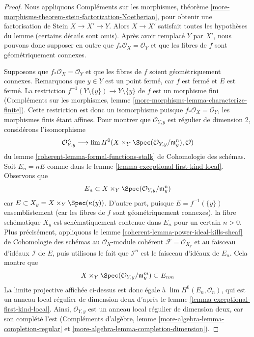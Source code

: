 \begin{proof} Nous appliquons Compléments sur les morphismes, théorème \ref{more-morphisms-theorem-stein-factorization-Noetherian}, pour obtenir une factorisation de Stein $X \to X' \to Y$. Alors $X \to X'$ satisfait toutes les hypothèses du lemme (certains détails sont omis). Après avoir remplacé $Y$ par $X'$, nous pouvons donc supposer en outre que $f_*\mathcal{O}_X = \mathcal{O}_Y$ et que les fibres de $f$ sont géométriquement connexes.

\medskip\noindent Supposons que $f_*\mathcal{O}_X = \mathcal{O}_Y$ et que les fibres de $f$ soient géométriquement connexes. Remarquons que $y \in Y$ est un point fermé, car $f$ est fermé et $E$ est fermé. La restriction $f^{-1}(Y \setminus \{y\}) \to Y \setminus \{y\}$ de $f$ est un morphisme fini (Compléments sur les morphismes, lemme \ref{more-morphisms-lemma-characterize-finite}). Cette restriction est donc un isomorphisme puisque $f_*\mathcal{O}_X = \mathcal{O}_Y$, les morphismes finis étant affines. Pour montrer que $\mathcal{O}_{Y, y}$ est régulier de dimension $2$, considérons l'isomorphisme $$
\mathcal{O}_{Y, y}^\wedge \longrightarrow
\lim H^0(X \times_Y \Spec(\mathcal{O}_{Y, y}/\mathfrak m_y^n), \mathcal{O})
$$ du lemme \ref{coherent-lemma-formal-functions-stalk} de Cohomologie des schémas. Soit $E_n = nE$ comme dans le lemme \ref{lemma-exceptional-first-kind-local}. Observons que $$
E_n \subset X \times_Y \Spec(\mathcal{O}_{Y, y}/\mathfrak m_y^n)
$$ car $E \subset X_y = X \times_Y \Spec(\kappa(y))$. D'autre part, puisque $E = f^{-1}(\{y\})$ ensemblistement (car les fibres de $f$ sont géométriquement connexes), la fibre schématique $X_y$ est schématiquement contenue dans $E_n$ pour un certain $n > 0$. Plus précisément, appliquons le lemme \ref{coherent-lemma-power-ideal-kills-sheaf} de Cohomologie des schémas au $\mathcal{O}_X$-module cohérent $\mathcal{F} = \mathcal{O}_{X_y}$ et au faisceau d'idéaux $\mathcal{I}$ de $E$, puis utilisons le fait que $\mathcal{I}^n$ est le faisceau d'idéaux de $E_n$. Cela montre que $$
X \times_Y \Spec(\mathcal{O}_{Y, y}/\mathfrak m_y^m) \subset E_{nm}
$$ La limite projective affichée ci-dessus est donc égale à $\lim H^0(E_n, \mathcal{O}_n)$, qui est un anneau local régulier de dimension deux d'après le lemme \ref{lemma-exceptional-first-kind-local}. Ainsi, $\mathcal{O}_{Y, y}$ est un anneau local régulier de dimension deux, car son complété l'est (Compléments d'algèbre, lemme \ref{more-algebra-lemma-completion-regular} et \ref{more-algebra-lemma-completion-dimension}).


\end{proof}
